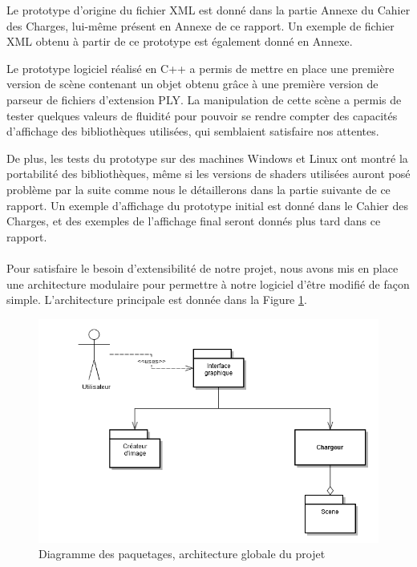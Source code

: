         Le prototype d'origine du fichier XML est donné dans la partie Annexe du Cahier des Charges, lui-même présent en Annexe de ce rapport. Un exemple de fichier XML obtenu à partir de ce prototype est également donné en Annexe.

        Le prototype logiciel réalisé en C++ a permis de mettre en place une première version de scène contenant un objet obtenu grâce à une première version de parseur de fichiers d'extension PLY. La manipulation de cette scène a permis de tester quelques valeurs de fluidité pour pouvoir se rendre compter des capacités d'affichage des bibliothèques utilisées, qui semblaient satisfaire nos attentes. 
        
        De plus, les tests du prototype sur des machines Windows et Linux ont montré la portabilité des bibliothèques, même si les versions de shaders utilisées auront posé problème par la suite comme nous le détaillerons dans la partie suivante de ce rapport. Un exemple d'affichage du prototype initial est donné dans le Cahier des Charges, et des exemples de l'affichage final seront donnés plus tard dans ce rapport.
\paragraph{}
        Pour satisfaire le besoin d'extensibilité de notre projet, nous avons mis en place une architecture modulaire pour permettre à notre logiciel d'être modifié de façon simple. L'architecture principale est donnée dans la Figure \ref{fig:archi_cdc}.

\begin{figure}[h]
	\centering      
	\includegraphics[scale=0.6]{old_pack.png}
	\caption{\label{fig:archi_cdc} Diagramme des paquetages, architecture globale du projet \protect \footnotemark }
\end{figure}

